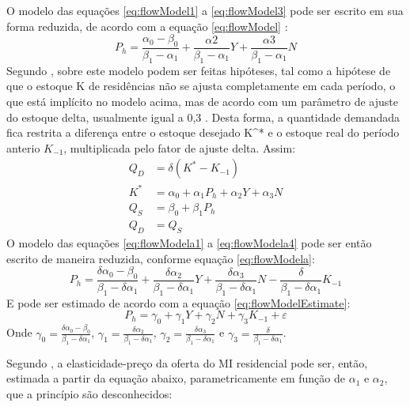 \documentclass[
	12pt,				%
	oneside,			%
	a4paper,			%
	chapter=TITLE,		%
	section=TITLE,		%
	english,			%
	brazil				%
	]{abntex2}
\begin{document}
\begin{refsection}
O modelo das equações \eqref{eq:flowModel1} a \eqref{eq:flowModel3} pode ser
escrito em sua forma reduzida, de acordo com a equação \eqref{eq:flowModel}
\autocite[ p.~283]{longrunsupplyelasticity}:
\begin{equation}
P_h = \frac{\alpha_0 - \beta_0}{\beta_1 - \alpha_1} + \frac{\alpha2}{\beta_1 - \alpha_1}Y + \frac{\alpha3}{\beta_1 - \alpha_1} N
\label{eq:flowModel}
\end{equation}
Segundo \textcite[p.~285]{longrunsupplyelasticity}, sobre este modelo podem ser feitas
hipóteses, tal como a hipótese de que o estoque \gls{K} de residências não se
ajusta completamente em cada período, o que está implícito no modelo acima, mas
de acordo com um parâmetro de ajuste do estoque \gls{delta}, usualmente igual a
0,3 \autocite[p.~285]{longrunsupplyelasticity}. Desta forma, a quantidade demandada
fica restrita a diferença entre o estoque desejado \gls{K^*} e o estoque real do
período anterio \(K_{-1}\), multiplicada pelo fator de ajuste \gls{delta}. Assim:
\begin{align} 
Q_D &= \delta (K^* - K_{-1}) \label{eq:flowModela1}\\ 
K^* &= \alpha_0 + \alpha_1 P_h + \alpha_2 Y + \alpha_3 N \label{eq:flowModela2}\\ 
Q_S &= \beta_0 + \beta_1 P_h \label{eq:flowModela3}\\
Q_D &= Q_S \label{eq:flowModela4}
\end{align}
O modelo das equações \eqref{eq:flowModela1} a \eqref{eq:flowModela4} pode ser
então escrito de maneira reduzida, conforme equação \eqref{eq:flowModela}:
\begin{equation}
P_h = \frac{\delta \alpha_0 - \beta_0}{\beta_1 - \delta \alpha_1} + \frac{\delta \alpha_2}{\beta_1 - \delta \alpha_1}Y + \frac{\delta \alpha_3}{\beta_1 - \delta \alpha_1} N - \frac{\delta}{\beta_1 - \delta \alpha_1}K_{-1}
\label{eq:flowModela}
\end{equation}
E pode ser estimado de acordo com a equação \eqref{eq:flowModelEstimate}:
\begin{equation}
P_h = \gamma_0 + \gamma_1 Y + \gamma_2 N + \gamma_3 K_{-1} + \varepsilon
\label{eq:flowModelEstimate}
\end{equation}
Onde \(\gamma_0 = \frac{\delta \alpha_0 - \beta_0}{\beta_1 - \delta \alpha_1}\), \(\gamma_1 = \frac{\delta \alpha_2}{\beta_1 - \delta \alpha_1}\), \(\gamma_2=\frac{\delta \alpha_3}{\beta_1 - \delta \alpha_1}\) e \(\gamma_3 = \frac{\delta}{\beta_1 - \delta \alpha_1}\).

Segundo \textcite[p.~285]{longrunsupplyelasticity}, a elasticidade-preço da oferta do
\gls{MI} residencial pode ser, então, estimada a partir da equação abaixo,
parametricamente em função de \(\alpha_1\) e \(\alpha_2\), que a princípio são
desconhecidos:


\end{refsection}
\end{document}
